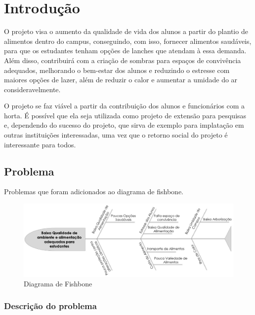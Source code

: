 \chapter{Introdução}

  O projeto visa o aumento da qualidade de vida dos alunos a partir do plantio de alimentos dentro do campus, conseguindo, com isso,
  fornecer alimentos saudáveis, para que os estudantes tenham opções de lanches que atendam à essa demanda. Além disso, contribuirá com a
  criação de sombras para espaços de convivência adequados, melhorando o bem-estar dos alunos e reduzindo o estresse com maiores opções de lazer, além de reduzir o calor e aumentar a umidade do ar consideravelmente.

  O projeto se faz viável a partir da contribuição dos alunos e funcionários com a horta. É possível que ela seja utilizada como projeto de extensão para pesquisas e, dependendo do sucesso do projeto, que sirva de exemplo para implatação em outras instituições interessadas, uma vez que o retorno social do projeto é interessante para todos.

\section{Problema}

  Problemas que foram adicionados ao diagrama de fishbone.

  \begin{figure}[!htb]
    \centering
    \includegraphics[width=15cm, keepaspectratio=true]{figuras/introducao/fishbone.eps}
    \caption{Diagrama de Fishbone}
  \end{figure}

\subsection{Descrição do problema}

  \newpage

